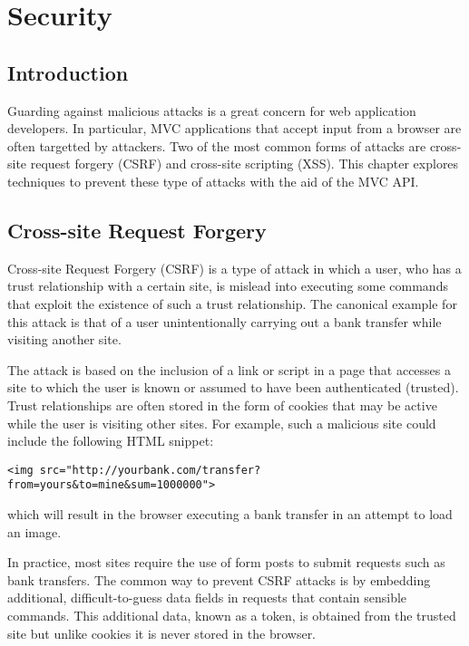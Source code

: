 \chapter{Security}
\label{security}

\section{Introduction}

Guarding against malicious attacks is a great concern for web application developers. In
particular, MVC applications that accept input from a browser are often targetted by 
attackers. Two of the most common forms of attacks are cross-site request forgery (CSRF)
and cross-site scripting (XSS). This chapter explores techniques to prevent these type
of attacks with the aid of the MVC API.

\section{Cross-site Request Forgery}

Cross-site Request Forgery (CSRF) is a type of attack in which a user, who has a trust
relationship with a certain site, is mislead into executing some commands that exploit the
existence of such a trust relationship. The canonical example for this attack is that of
a user unintentionally carrying out a bank transfer while visiting another site. 

The attack is based on the inclusion of a link or script in a page that accesses a site 
to which the user is known or assumed to have been authenticated (trusted). Trust
relationships are often stored in the form of cookies that may be active while the user
is visiting other sites. For example, such a malicious site could include the following
HTML snippet:

\begin{verbatim}
<img src="http://yourbank.com/transfer?from=yours&to=mine&sum=1000000">
\end{verbatim}

which will result in the browser executing a bank transfer in an attempt to load an image.

In practice, most sites require the use of form posts to submit requests such as bank
transfers. The common way to prevent CSRF attacks is by embedding additional, 
difficult-to-guess data fields in requests that contain sensible commands. This 
additional data, known as a token, is obtained from the trusted site but 
unlike cookies it is never stored in the browser.

